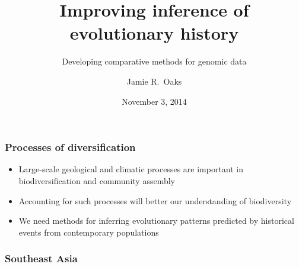

\newcommand{\allParameters}[1]{\ensuremath{\theta_{#1}}\xspace}


\title[Improving inference of evolutionary history]{Improving inference of evolutionary history}
\subtitle{Developing comparative methods for genomic data}

\author[J.\ Oaks]{
    Jamie R.\ Oaks
}

\date{November 3, 2014}


\maketitle

\begin{frame}
    \frametitle{Processes of diversification}
        \begin{itemize}
            \item<1-> Large-scale geological and climatic processes are
                important in biodiversification and community assembly
            \item<2-> Accounting for such processes will better our
                understanding of biodiversity
            \item<3-> We need methods for inferring evolutionary patterns
                predicted by historical events from contemporary populations
        \end{itemize}
\end{frame}

{
\begin{frame}
    \frametitle{Southeast Asia}    
\end{frame}
}

